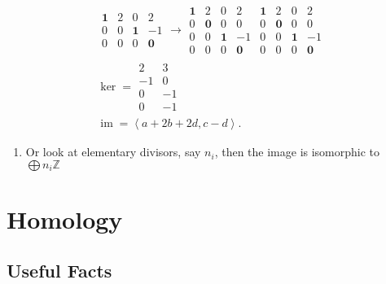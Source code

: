 \begin{enumerate}
  \begin{align*}  \begin{matrix}  \mathbf1&2&0&2\\0&0&\mathbf1&-1\\0&0&0&\mathbf0  \end{matrix}   \to  \begin{matrix}  \mathbf1&2&0&2\\0&\mathbf0&0&0\\0&0&\mathbf1&-1\\0&0&0&\mathbf0  \end{matrix}  \begin{matrix}  \mathbf1&2&0&2\\0&\mathbf0&0&0\\0&0&\mathbf1&-1\\0&0&0&\mathbf0  \end{matrix} \\  \ker =   \begin{matrix}  2\\-1\\0\\0  \end{matrix}   \begin{matrix}  3\\0\\-1\\-1  \end{matrix}\\  \operatorname{im}= \left\langle{a+2b+2d,c-d}\right\rangle  .\end{align*}

  \begin{enumerate}
  \def\labelenumii{\arabic{enumii}.}
  \setcounter{enumii}{5}
  \tightlist
  \item
    Or look at elementary divisors, say \(n_i\), then the image is
    isomorphic to \(\bigoplus n_i {\mathbb{Z}}\)
  \end{enumerate}
\end{enumerate}

\hypertarget{homology-1}{%
\section{Homology}\label{homology-1}}

\hypertarget{useful-facts-2}{%
\subsection{Useful Facts}\label{useful-facts-2}}

